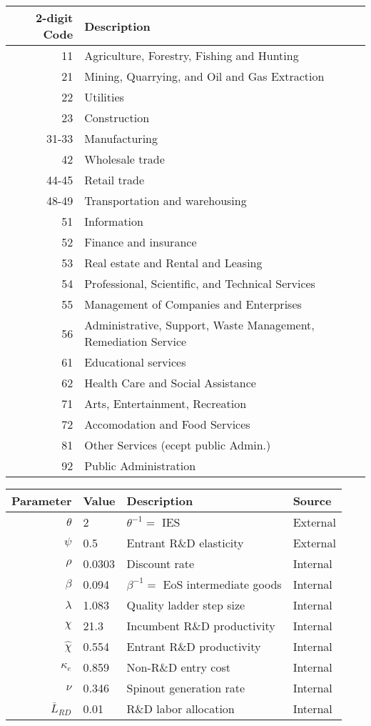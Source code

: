 \documentclass[11pt,english]{article}
\theoremstyle{definition}
\begin{document}
\begin{table}[]
	\centering
	\label{}
	\begin{tabular}{rl}
		\toprule \toprule
		2-digit Code & Description \tabularnewline
		\midrule
		11  & Agriculture, Forestry, Fishing and Hunting \tabularnewline
		21  & Mining, Quarrying, and Oil and Gas Extraction\tabularnewline
		22  & Utilities\tabularnewline
		23  & Construction \tabularnewline
		31-33 & Manufacturing \tabularnewline
		42 & Wholesale trade \tabularnewline
		44-45 & Retail trade \tabularnewline
		48-49 & Transportation and warehousing \tabularnewline
		51 & Information \tabularnewline
		52 & Finance and insurance \tabularnewline
		53 & Real estate and Rental and Leasing \tabularnewline
		54 & Professional, Scientific, and Technical Services \tabularnewline
		55 & Management of Companies and Enterprises \tabularnewline
		56 & Administrative, Support, Waste Management, Remediation Service \tabularnewline
		61 & Educational services \tabularnewline
		62 & Health Care and Social Assistance \tabularnewline
		71 & Arts, Entertainment, Recreation \tabularnewline
		72 & Accomodation and Food Services \tabularnewline
		81 & Other Services (ecept public Admin.) \tabularnewline
		92 & Public Administration\tabularnewline
		\bottomrule
	\end{tabular}
\end{table}

\begin{table}[]
	\centering
	\label{calibration_2_parameters}
	\begin{tabular}{rlll}
		\toprule \toprule
		Parameter & Value & Description & Source \tabularnewline
		\midrule
		$\theta$ & 2 & $\theta^{-1} = $ IES & External 
		\tabularnewline
		$\psi$ & 0.5 & Entrant R\&D elasticity & External \tabularnewline
		$\rho$ & 0.0303 & Discount rate  & Internal \tabularnewline
		$\beta$ & 0.094 & $\beta^{-1} = $ EoS intermediate goods & Internal \tabularnewline 
		$\lambda$ & 1.083 & Quality ladder step size & Internal 
		\tabularnewline
		$\chi$ & 21.3 & Incumbent R\&D productivity & Internal 
		\tabularnewline
		$\hat{\chi}$ & 0.554 & Entrant R\&D productivity & Internal \tabularnewline 
		$\kappa_e$ & 0.859 & Non-R\&D entry cost & Internal \tabularnewline
		$\nu$ & 0.346 & Spinout generation rate  & Internal\tabularnewline
		$\bar{L}_{RD}$ & 0.01 & R\&D labor allocation  & Internal \tabularnewline
		\bottomrule
	\end{tabular}
\end{table}
\end{document}
